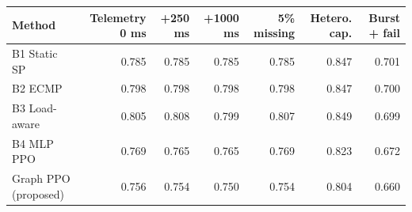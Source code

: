 \begin{tabular}{lrrrrrr}
\toprule
Method & Telemetry 0 ms & +250 ms & +1000 ms & 5\% missing & Hetero. cap. & Burst + fail \\
\midrule
B1 Static SP & 0.785 & 0.785 & 0.785 & 0.785 & 0.847 & 0.701 \\
B2 ECMP & 0.798 & 0.798 & 0.798 & 0.798 & 0.847 & 0.700 \\
B3 Load-aware & 0.805 & 0.808 & 0.799 & 0.807 & 0.849 & 0.699 \\
B4 MLP PPO & 0.769 & 0.765 & 0.765 & 0.769 & 0.823 & 0.672 \\
Graph PPO (proposed) & 0.756 & 0.754 & 0.750 & 0.754 & 0.804 & 0.660 \\
\bottomrule
\end{tabular}